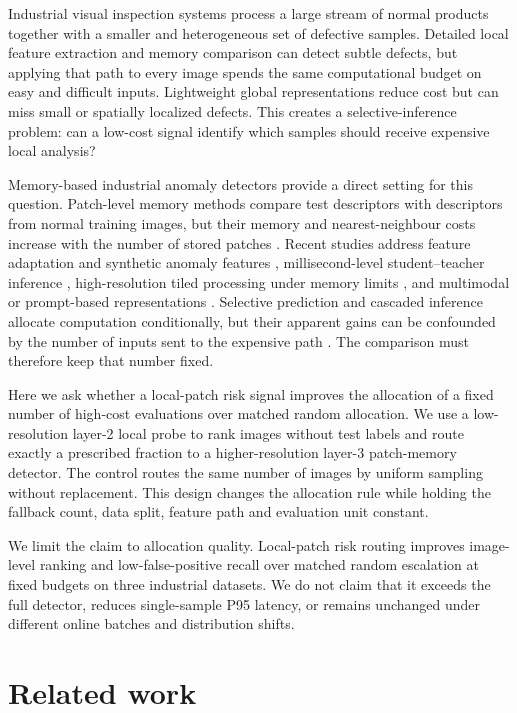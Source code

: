 \documentclass[pdflatex,sn-vancouver-num]{sn-jnl}
\begin{document}
Industrial visual inspection systems process a large stream of normal products together with a smaller and heterogeneous set of defective samples. Detailed local feature extraction and memory comparison can detect subtle defects, but applying that path to every image spends the same computational budget on easy and difficult inputs. Lightweight global representations reduce cost but can miss small or spatially localized defects. This creates a selective-inference problem: can a low-cost signal identify which samples should receive expensive local analysis?

Memory-based industrial anomaly detectors provide a direct setting for this question. Patch-level memory methods compare test descriptors with descriptors from normal training images, but their memory and nearest-neighbour costs increase with the number of stored patches \cite{bergmann2019mvtec,defard2021padim,roth2022patchcore}. Recent studies address feature adaptation and synthetic anomaly features \cite{liu2023simplenet}, millisecond-level student--teacher inference \cite{batzner2024efficientad}, high-resolution tiled processing under memory limits \cite{rolih2024divide}, and multimodal or prompt-based representations \cite{jeong2023winclip,li2024promptad,li2024promptadzero,costanzino2024multimodal}. Selective prediction and cascaded inference allocate computation conditionally, but their apparent gains can be confounded by the number of inputs sent to the expensive path \cite{geifman2017selective}. The comparison must therefore keep that number fixed.

Here we ask whether a local-patch risk signal improves the allocation of a fixed number of high-cost evaluations over matched random allocation. We use a low-resolution layer-2 local probe to rank images without test labels and route exactly a prescribed fraction to a higher-resolution layer-3 patch-memory detector. The control routes the same number of images by uniform sampling without replacement. This design changes the allocation rule while holding the fallback count, data split, feature path and evaluation unit constant.

We limit the claim to allocation quality. Local-patch risk routing improves image-level ranking and low-false-positive recall over matched random escalation at fixed budgets on three industrial datasets. We do not claim that it exceeds the full detector, reduces single-sample P95 latency, or remains unchanged under different online batches and distribution shifts.

\section{Related work}\label{sec:related}
\end{document}
